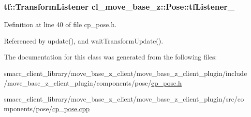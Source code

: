 \subsubsection[{\texorpdfstring{tf\+Listener\+\_\+}{tfListener_}}]{\setlength{\rightskip}{0pt plus 5cm}tf\+::\+Transform\+Listener cl\+\_\+move\+\_\+base\+\_\+z\+::\+Pose\+::tf\+Listener\+\_\+\hspace{0.3cm}{\ttfamily [private]}}\hypertarget{classcl__move__base__z_1_1Pose_a6d669632db37e0e51734d2a65e8dcd41}{}\label{classcl__move__base__z_1_1Pose_a6d669632db37e0e51734d2a65e8dcd41}


Definition at line 40 of file cp\+\_\+pose.\+h.



Referenced by update(), and wait\+Transform\+Update().



The documentation for this class was generated from the following files\+:\begin{DoxyCompactItemize}
\item 
smacc\+\_\+client\+\_\+library/move\+\_\+base\+\_\+z\+\_\+client/move\+\_\+base\+\_\+z\+\_\+client\+\_\+plugin/include/move\+\_\+base\+\_\+z\+\_\+client\+\_\+plugin/components/pose/\hyperlink{cp__pose_8h}{cp\+\_\+pose.\+h}\item 
smacc\+\_\+client\+\_\+library/move\+\_\+base\+\_\+z\+\_\+client/move\+\_\+base\+\_\+z\+\_\+client\+\_\+plugin/src/components/pose/\hyperlink{cp__pose_8cpp}{cp\+\_\+pose.\+cpp}\end{DoxyCompactItemize}
